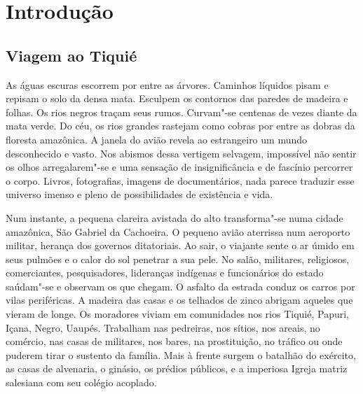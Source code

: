 \chapter*{Introdução\smallskip{}}
\pagestyle{intro}

\setlength{\epigraphwidth}{.40\textwidth}
\begin{epigraphs} 
\end{epigraphs}

\section{Viagem ao Tiquié}\label{viagem-ao-tiquiuxe9}

As águas escuras escorrem por entre as árvores. Caminhos líquidos pisam
e repisam o solo da densa mata. Esculpem os contornos das paredes de
madeira e folhas. Os rios negros traçam seus rumos. Curvam"-se centenas
de vezes diante da mata verde. Do céu, os rios grandes rastejam como
cobras por entre as dobras da floresta amazônica. A janela do avião
revela ao estrangeiro um mundo desconhecido e vasto. Nos abismos dessa
vertigem selvagem, impossível não sentir os olhos arregalarem"-se e uma
sensação de insignificância e de fascínio percorrer o corpo. Livros,
fotografias, imagens de documentários, nada parece traduzir esse
universo imenso e pleno de possibilidades de existência e vida.

Num instante, a pequena clareira avistada do alto transforma"-se numa
cidade amazônica, São Gabriel da Cachoeira. O pequeno avião aterrissa
num aeroporto militar, herança dos governos ditatoriais. Ao sair, o
viajante sente o ar úmido em seus pulmões e o calor do sol penetrar a
sua pele. No salão, militares, religiosos, comerciantes, pesquisadores,
lideranças indígenas e funcionários do estado saúdam"-se e observam os
que chegam. O asfalto da estrada conduz os carros por vilas periféricas.
A madeira das casas e os telhados de zinco abrigam aqueles que vieram de
longe. Os moradores viviam em comunidades nos rios Tiquié, Papuri,
Içana, Negro, Uaupés. Trabalham nas pedreiras, nos sítios, nos areais,
no comércio, nas casas de militares, nos bares, na prostituição, no
tráfico ou onde puderem tirar o sustento da família. Mais à frente
surgem o batalhão do exército, as casas de alvenaria, o ginásio, os
prédios públicos, e a imperiosa Igreja matriz salesiana com seu colégio
acoplado.

